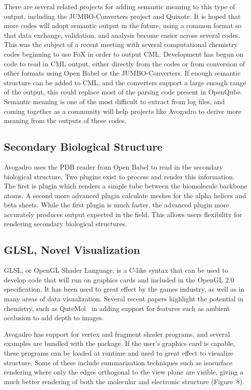 \documentclass[10pt]{bmc_article}
\newenvironment{bmcformat}{\begin{raggedright}
  \baselineskip20pt\sloppy\setboolean{publ}{false}}{\end{raggedright}
  \baselineskip20pt\sloppy}
\begin{document}
\begin{bmcformat}
There are several related projects for adding semantic meaning to this type of output,
including the JUMBO-Converters project and Quixote. It is hoped that more codes
will adopt semantic output in the future, using a common format so that data exchange,
validation, and analysis become easier across several codes. This was the subject of
a recent meeting with several computational chemistry codes beginning to use FoX
in order to output CML. Development has begun on code to read in CML output,
either directly from the codes or from conversion of other formats using Open Babel
or the JUMBO-Converters. If enough semantic structure can be added to CML, and the
converters support a large enough range of the output, this could replace most of
the parsing code present in OpenQube. Semantic meaning is one of the most
difficult to extract from log files, and coming together as a community will help
projects like Avogadro to derive more meaning from the outputs of these codes.

\subsection*{Secondary Biological Structure}

Avogadro uses the PDB reader from Open Babel to read in the secondary
biological structure. Two plugins exist to process and render this information.
The first is plugin which renders a simple tube between the biomolecule
backbone atoms. A second more advanced plugin calculate meshes for
the alpha helices and beta sheets. While the first plugin is much
faster, the advanced plugin more accurately produces output expected
in the field.  This allows users flexibility for rendering
secondary biological structures.

\subsection*{GLSL, Novel Visualization}

GLSL, or OpenGL Shader Language, is a C-like syntax that can be used to develop
code that will run on graphics cards and included in the OpenGL 2.0
specification. It has been used to great effect by the games industry,
as well as in many areas of data visualization. Several recent papers
highlight the potential in chemistry, such as QuteMol~\cite{QuteMol}
in adding support for features such as ambient occlusion to add depth to images.

Avogadro has support for vertex and fragment shader programs, and several
examples are bundled with the package. If the user's graphics card is capable,
these programs can be loaded at runtime and used to great effect to visualize
structure. Some of these include summarization techniques such as isosurface
rendering where only the edges orthogonal to the view plane are visible, giving
a much better rendering of both the molecular and electronic structure (Figure~8).


\end{bmcformat}
\end{document}
